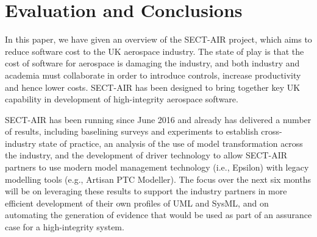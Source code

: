 \section{Evaluation and Conclusions}
\label{sec:conclusions}

In this paper, we have given an overview of the SECT-AIR project, which aims to reduce software cost to the UK aerospace industry. The state of play is that the cost of software for aerospace is damaging the industry, and both industry and academia must collaborate in order to introduce controls, increase productivity and hence lower costs. SECT-AIR has been designed to bring together key UK capability in development of high-integrity aerospace software.

SECT-AIR has been running since June 2016 and already has delivered a number of results, including baselining surveys and experiments to establish cross-industry state of practice, an analysis of the use of model transformation across the industry, and the development of driver technology to allow SECT-AIR partners to use modern model management technology (i.e., Epsilon) with legacy modelling tools (e.g., Artisan PTC Modeller). The focus over the next six months will be on leveraging these results to support the industry partners in more efficient development of their own profiles of UML and SysML, and on automating the generation of evidence that would be used as part of an assurance case for a high-integrity system.

